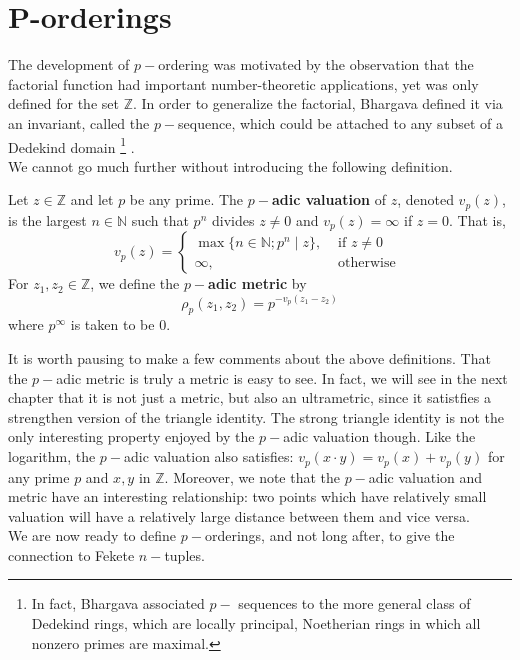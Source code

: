 \section{P-orderings}

The development of $p-$ordering was motivated by the observation that the factorial function had important number-theoretic applications, yet was only defined for the set $\mathbb{Z}$. In order to generalize the factorial, Bhargava defined it via an invariant, called the $p-$sequence, which could be attached to any subset of a Dedekind domain \footnote{In fact, Bhargava associated $p-$ sequences to the more general class of Dedekind rings, which are locally principal, Noetherian rings in which all nonzero
primes are maximal.}    \cite{mb1}.\\

We cannot go much further without introducing the following definition. 

\begin{definition}
Let $z \in \mathbb{Z}$ and let $p$ be any prime. The \textbf{$p-$adic valuation} of $z$, denoted $v_p(z)$, is the largest $n \in \mathbb{N}$ such that $p^n$ divides $z \neq 0$ and $v_p(z) = \infty$ if $z=0$. That is,
\[
v_p(z) = 
\begin{cases}
 \max\{n \in \mathbb{N}; p^n \mid z\}, & \text{ if } z \neq 0 \\
         \infty, & \text{ otherwise }
\end{cases}
\]
For $z_1,z_2 \in \mathbb{Z}$,  we define the \textbf{$p-$adic metric} by 
\[\rho_p(z_1,z_2) = p^{-v_p(z_1-z_2)}\]
where $p^\infty$ is taken to be $0$. 
\end{definition}

It is worth pausing to make a few comments about the above definitions. That the $p-$adic metric is truly a metric is easy to see. In fact, we will see in the next chapter that it is not just a metric, but also an ultrametric, since it satistfies a strengthen version of the triangle identity. The strong triangle identity is not the only interesting property enjoyed by the $p-$adic valuation though. Like the logarithm, the $p-$adic valuation also satisfies: $v_p(x \cdot y) = v_p(x) + v_p(y)$ for any prime $p$ and $x,y$ in $\mathbb{Z}$. Moreover, we note that the $p-$adic valuation and metric have an interesting relationship: two points which have relatively small valuation will have a relatively large distance between them and vice versa. \\

We are now ready to define $p-$orderings, and not long after, to give the connection to Fekete $n-$tuples.\\

